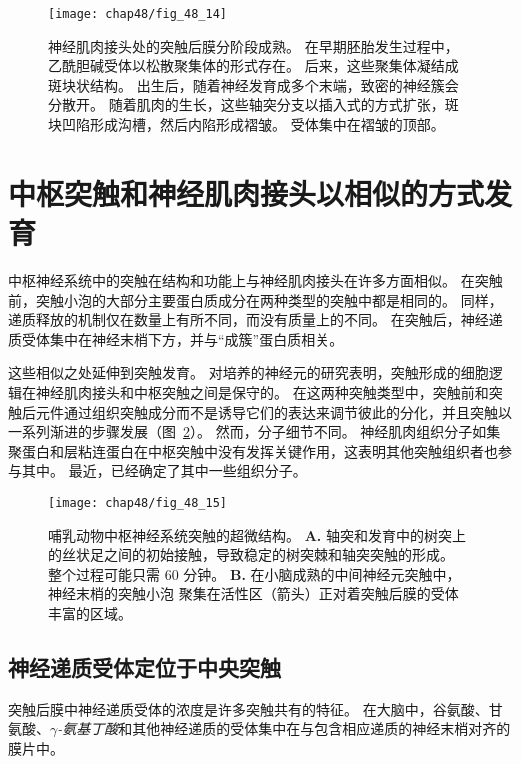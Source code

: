 \begin{figure}[htbp]
	\centering
	\texttt{[image: chap48/fig\_48\_14]}
	\caption{神经肌肉接头处的突触后膜分阶段成熟。
		在早期胚胎发生过程中，乙酰胆碱受体以松散聚集体的形式存在。
		后来，这些聚集体凝结成斑块状结构。
		出生后，随着神经发育成多个末端，致密的神经簇会分散开。
		随着肌肉的生长，这些轴突分支以插入式的方式扩张，斑块凹陷形成沟槽，然后内陷形成褶皱。
		受体集中在褶皱的顶部\cite{sanes2001induction}。}
	\label{fig:48_14}
\end{figure}



\section{中枢突触和神经肌肉接头以相似的方式发育}

中枢神经系统中的突触在结构和功能上与神经肌肉接头在许多方面相似。
在突触前，突触小泡的大部分主要蛋白质成分在两种类型的突触中都是相同的。
同样，递质释放的机制仅在数量上有所不同，而没有质量上的不同。
在突触后，神经递质受体集中在神经末梢下方，并与“成簇”蛋白质相关。


这些相似之处延伸到突触发育。
对培养的神经元的研究表明，突触形成的细胞逻辑在神经肌肉接头和中枢突触之间是保守的。
在这两种突触类型中，突触前和突触后元件通过组织突触成分而不是诱导它们的表达来调节彼此的分化，并且突触以一系列渐进的步骤发展（图~\ref{fig:48_15}）。
然而，分子细节不同。
神经肌肉组织分子如集聚蛋白和层粘连蛋白在中枢突触中没有发挥关键作用，这表明其他突触组织者也参与其中。
最近，已经确定了其中一些组织分子。


\begin{figure}[htbp]
	\centering
	\texttt{[image: chap48/fig\_48\_15]}
	\caption{哺乳动物中枢神经系统突触的超微结构。
		\textbf{A.} 轴突和发育中的树突上的丝状足之间的初始接触，导致稳定的树突棘和轴突突触的形成。
		整个过程可能只需 60 分钟。
		\textbf{B.} 在小脑成熟的中间神经元突触中，神经末梢的突触小泡 聚集在活性区（箭头）正对着突触后膜的受体丰富的区域。}
	\label{fig:48_15}
\end{figure}



\subsection{神经递质受体定位于中央突触}

突触后膜中神经递质受体的浓度是许多突触共有的特征。
在大脑中，谷氨酸、甘氨酸、\textit{$ \gamma $-氨基丁酸}和其他神经递质的受体集中在与包含相应递质的神经末梢对齐的膜片中。


